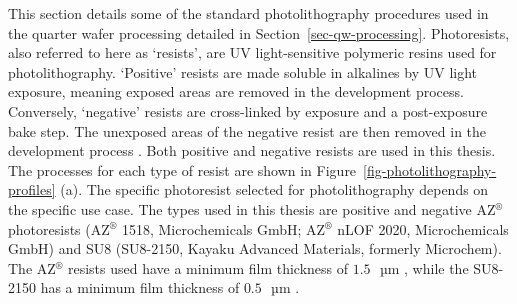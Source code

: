 \documentclass[
  a4paper,
]{scrbook}
\begin{document}
This section details some of the standard photolithography procedures
used in the quarter wafer processing detailed in
Section~\ref{sec-qw-processing}. Photoresists, also referred to here as
`resists', are UV light-sensitive polymeric resins used for
photolithography. `Positive' resists are made soluble in alkalines by UV
light exposure, meaning exposed areas are removed in the development
process. Conversely, `negative' resists are cross-linked by exposure and
a post-exposure bake step. The unexposed areas of the negative resist
are then removed in the development process \autocite{Microchemicals1}.
Both positive and negative resists are used in this thesis. The
processes for each type of resist are shown in
Figure~\ref{fig-photolithography-profiles} (a). The specific photoresist
selected for photolithography depends on the specific use case. The
types used in this thesis are positive and negative AZ\(^\circledR\)
photoresists (AZ\(^\circledR\) 1518, Microchemicals GmbH;
AZ\(^\circledR\) nLOF 2020, Microchemicals GmbH) and SU8 (SU8-2150,
Kayaku Advanced Materials, formerly Microchem). The AZ\(^\circledR\)
resists used have a minimum film thickness of
\(1.5\textrm{ } \textrm{µm}\) \autocite{Microchemicals1}, while the
SU8-2150 has a minimum film thickness of \(0.5\textrm{ } \textrm{µm}\)
\autocite{Kayaku}.
\end{document}
